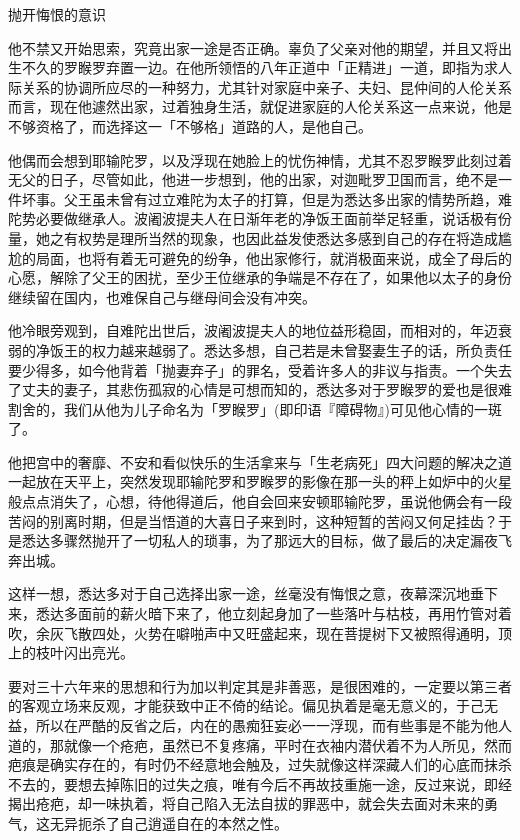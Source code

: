 \documentclass[12pt,twoside,openany]{book}
\begin{document}
抛开悔恨的意识

他不禁又开始思索，究竟出家一途是否正确。辜负了父亲对他的期望，并且又将出生不久的罗睺罗弃置一边。在他所领悟的八年正道中「正精进」一道，即指为求人际关系的协调所应尽的一种努力，尤其针对家庭中亲子、夫妇、昆仲间的人伦关系而言，现在他遽然出家，过着独身生活，就促进家庭的人伦关系这一点来说，他是不够资格了，而选择这一「不够格」道路的人，是他自己。

他偶而会想到耶输陀罗，以及浮现在她脸上的忧伤神情，尤其不忍罗睺罗此刻过着无父的日子，尽管如此，他进一步想到，他的出家，对迦毗罗卫国而言，绝不是一件坏事。父王虽未曾有过立难陀为太子的打算，但是为悉达多出家的情势所趋，难陀势必要做继承人。波阇波提夫人在日渐年老的净饭王面前举足轻重，说话极有份量，她之有权势是理所当然的现象，也因此益发使悉达多感到自己的存在将造成尴尬的局面，也将有着无可避免的纷争，他出家修行，就消极面来说，成全了母后的心愿，解除了父王的困扰，至少王位继承的争端是不存在了，如果他以太子的身份继续留在国内，也难保自己与继母间会没有冲突。

他冷眼旁观到，自难陀出世后，波阇波提夫人的地位益形稳固，而相对的，年迈衰弱的净饭王的权力越来越弱了。悉达多想，自己若是未曾娶妻生子的话，所负责任要少得多，如今他背着「抛妻弃子」的罪名，受着许多人的非议与指责。一个失去了丈夫的妻子，其悲伤孤寂的心情是可想而知的，悉达多对于罗睺罗的爱也是很难割舍的，我们从他为儿子命名为「罗睺罗」(即印语『障碍物』)可见他心情的一斑了。

他把宫中的奢靡、不安和看似快乐的生活拿来与「生老病死」四大问题的解决之道一起放在天平上，突然发现耶输陀罗和罗睺罗的影像在那一头的秤上如炉中的火星般点点消失了，心想，待他得道后，他自会回来安顿耶输陀罗，虽说他俩会有一段苦闷的别离时期，但是当悟道的大喜日子来到时，这种短暂的苦闷又何足挂齿？于是悉达多骤然抛开了一切私人的琐事，为了那远大的目标，做了最后的决定漏夜飞奔出城。

这样一想，悉达多对于自己选择出家一途，丝毫没有悔恨之意，夜幕深沉地垂下来，悉达多面前的薪火暗下来了，他立刻起身加了一些落叶与枯枝，再用竹管对着吹，余灰飞散四处，火势在噼啪声中又旺盛起来，现在菩提树下又被照得通明，顶上的枝叶闪出亮光。

要对三十六年来的思想和行为加以判定其是非善恶，是很困难的，一定要以第三者的客观立场来反观，才能获致中正不倚的结论。偏见执着是毫无意义的，于己无益，所以在严酷的反省之后，内在的愚痴狂妄必一一浮现，而有些事是不能为他人道的，那就像一个疮疤，虽然已不复疼痛，平时在衣袖内潜伏着不为人所见，然而疤痕是确实存在的，有时仍不经意地会触及，过失就像这样深藏人们的心底而抹杀不去的，要想去掉陈旧的过失之痕，唯有今后不再故技重施一途，反过来说，即经揭出疮疤，却一味执着，将自己陷入无法自拔的罪恶中，就会失去面对未来的勇气，这无异扼杀了自己逍遥自在的本然之性。
\end{document}
